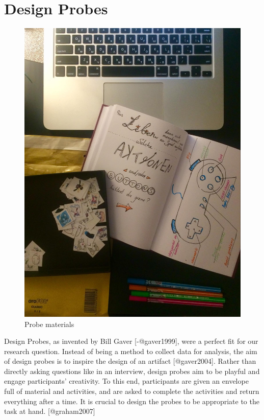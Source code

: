 \documentclass[]{vutinfth}
\begin{document}
\hypertarget{design-probes}{%
\section{Design Probes}\label{design-probes}}

\begin{figure}
\centering
\includegraphics{images/probe-materials.jpg}
\caption{Probe materials}
\end{figure}

Design Probes, as invented by Bill Gaver {[}-@gaver1999{]}, were a
perfect fit for our research question. Instead of being a method to
collect data for analysis, the aim of design probes is to inspire the
design of an artifact {[}@gaver2004{]}. Rather than directly asking
questions like in an interview, design probes aim to be playful and
engage participants' creativity. To this end, participants are given an
envelope full of material and activities, and are asked to complete the
activities and return everything after a time. It is crucial to design
the probes to be appropriate to the task at hand. {[}@graham2007{]}
\end{document}
